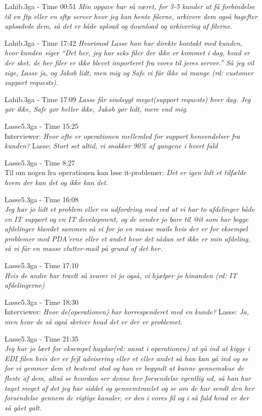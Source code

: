 \begin{thebibliography}{9}
	Lahib.3ga - Time 00:51
	\textit{Min opgave har så været, for 3-5 kunder at få forbindelse til en ftp eller en sftp server hvor jeg kan hente filerne, arkivere dem også bagefter uploadede dem, så det er både upload og download og arkivering af filerne.}

	Lahib.3ga - Time 17:42
	\textit{Hvorimod Lasse han har direkte kontakt med kunden, hvor kunden siger “Det her, jeg har seks filer der ikke er kommet i dag, hvad er der sket, de her filer er ikke blevet importeret fra vores til jeres server.” Så jeg vil sige, Lasse ja, og Jakob lidt, men mig og Safe vi får ikke så mange \emph{(rd: customer support requests)}.}

	Lahib.3ga - Time 17:09
	\textit{Lasse får sindsygt meget(support requests) hver dag. Jeg gør ikke, Safe gør heller ikke, Jakob gør lidt, mere end mig.}

	Lasse5.3ga - Time 15:25 \\
	Interviewer: \textit{Hvor ofte er operationen mellemled for support henvendelser fra kunden?} Lasse: \textit{Stort set altid, vi snakker 90\% af gangene i hvert fald}

	Lasse5.3ga - Time 8:27 \\
	Til om nogen fra operationen kan løse it-problemer: \textit{Det er igen lidt et tilfælde hvem der kan det og ikke kan det.}

	Lasse5.3ga - Time 16:08 \\
	\textit{Jeg har jo lidt et problem eller en udfordring med ved at vi har to afdelinger både en IT support og en IT development, og de sender jo bare til @it som har begge afdelinger blandet sammen så vi for jo en masse mails hvis der er for eksempel problemer med PDA’erne eller et andet hvor det sådan set ikke er min afdeling, så vi får en masse clutter-mail på grund af det her.}

	Lasse5.3ga - Time 17:10 \\
	\textit{Hvis de andre har travlt så svarer vi jo også, vi hjælper jo hinanden \emph{(rd: IT afdelingerne)}}

	Lasse5.3ga - Time 18:30 \\
	Interviewer: \textit{Hvor de(operationen) har korrespenderet med en kunde?} Lasse: \textit{Ja, men hvor de så også skriver hvad det er der er problemet.}

	Lasse5.3ga - Time 21:35 \\
	\textit{Jeg har jo lært for eksempel haydar\emph{(rd: ansat i operationen)} at gå ind at kigge i EDI filen hvis der er fejl advisering eller et eller andet så han kan gå ind og se for vi gemmer dem et bestemt sted og han er begyndt at kunne gennemskue de fleste af dem, altså se hvordan ser denne her forsendelse egentlig ud, så han har taget meget af det jeg har siddet og gennemtrawlet og se om de har sendt den her forsendelse gennem de rigtige kanaler, er den i vores fil og i så fald hvad er der så gået galt.}


\end{thebibliography}
